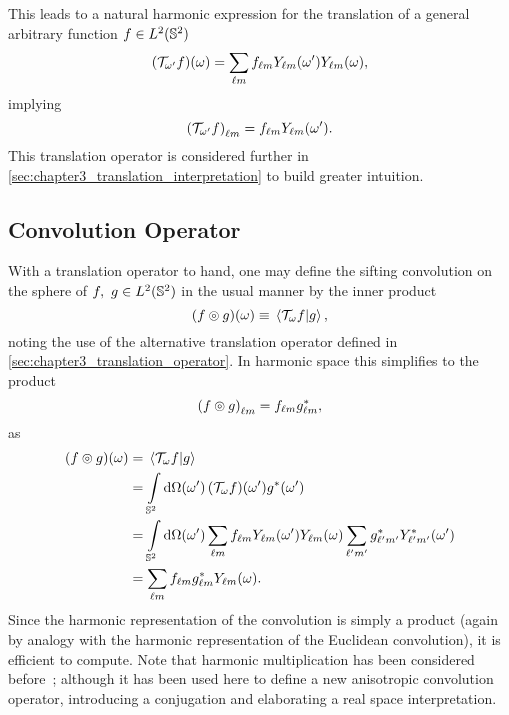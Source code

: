 This leads to a natural harmonic expression for the translation of a general arbitrary function \(f \in \hilbert{\twoSphere}\)
%
\begin{equation}\label{eq:chapter3_translation_real}
	\pixel{(\translation{\omega'}f)}
	= \harmonicSum \harmonic{f} \pixel[']{\harmonic{Y}} \pixel{\harmonic{Y}},
\end{equation}
%
implying
%
\begin{equation}\label{eq:chapter3_translation_harmonic}
	\harmonic{(\translation{\omega'}f)}
	= \harmonic{f} \pixel[']{\harmonic{Y}}.
\end{equation}
%
This translation operator is considered further in \cref{sec:chapter3_translation_interpretation} to build greater intuition.

\subsection{Convolution Operator}

With a translation operator to hand, one may define the sifting convolution on the sphere of \(f,\ g \in \hilbert{\twoSphere}\) in the usual manner by the inner product
%
\begin{equation}\label{eq:chapter3_convolution_real}
	\pixel{\convolution{f}{g}}
	\equiv \braket*{\translation{\omega}f}{g},
\end{equation}
%
noting the use of the alternative translation operator defined in \cref{sec:chapter3_translation_operator}.
In harmonic space this simplifies to the product
%
\begin{equation}\label{eq:chapter3_convolution_harmonic}
	\harmonic{\convolution{f}{g}}
	= \harmonic{f} \conj{\harmonic{g}},
\end{equation}
%
as
%
\begin{align}
	\pixel{(f \circledcirc g)}
	 & = \braket*{\translation{\omega}f}{g} \nonumber{}                                                                                                                                        \\
	 & = \integrateSphere{\omega'} \pixel[']{(\translation{\omega}f)} \pixel[']{\conj{g}} \nonumber{}                                                                                          \\
	 & = \integrateSphere{\omega'} \harmonicSum \harmonic{f} \pixel[']{\harmonic{Y}} \pixel{\harmonic{Y}} \harmonicSum['] \conj{\harmonic[']{g}} \pixel[']{\conj{\harmonic[']{Y}}} \nonumber{} \\
	 & = \harmonicSum \harmonic{f} \conj{\harmonic{g}} \pixel{\harmonic{Y}}.
\end{align}
%
Since the harmonic representation of the convolution is simply a product (again by analogy with the harmonic representation of the Euclidean convolution), it is efficient to compute.
Note that harmonic multiplication has been considered before~\cite{Kennedy2011}; although it has been used here to define a new anisotropic convolution operator, introducing a conjugation and elaborating a real space interpretation.

